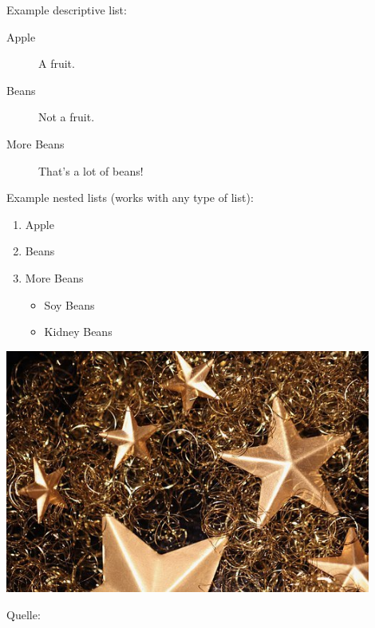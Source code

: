 Example descriptive list:\\
\begin{description}
    \item[Apple] A fruit.
    \item[Beans] Not a fruit.
    \item[More Beans] That's a lot of beans!
\end{description}

Example nested lists (works with any type of list):\\
\begin{enumerate}
    \item Apple
    \item Beans
    \item More Beans
        \begin{itemize}
            \item Soy Beans
            \item Kidney Beans
        \end{itemize}
\end{enumerate}

\begin{nicepic}
    \includegraphics[width=0.9\textwidth]{images/stars.jpg}
    \caption*{Quelle: \cite{bib:vodafone-legt-in-pirmasens}}
    \label{fig:stars}
\end{nicepic}

